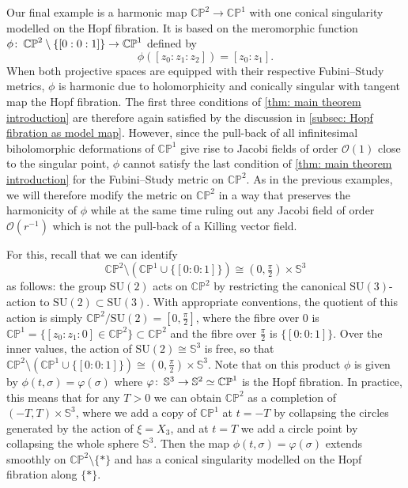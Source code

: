 \documentclass{article}
\numberwithin{equation}{section}        %
\theoremstyle{bfnote}
\theoremstyle{definition}
\theoremstyle{bfremark}
\newcommand{\col}{\colon \thinspace}        %
\newcommand{\Sp}{\mathbb{S}}                %
\begin{document}
Our final example is a harmonic map $\mathbb{CP}^2 \to \mathbb{CP}^1$ with one conical singularity modelled on the Hopf fibration. It is based on the meromorphic function $\phi \col \mathbb{CP}^2 \setminus \{[0:0:1]\} \to \mathbb{CP}^1$ defined by 
\begin{equation*}
    \phi([z_0:z_1:z_2]) = [z_0:z_1] .
\end{equation*}
When both projective spaces are equipped with their respective Fubini--Study metrics, $\phi$ is harmonic due to holomorphicity and conically singular with tangent map the Hopf fibration. The first three conditions of \cref{thm: main theorem introduction} are therefore again satisfied by the discussion in \cref{subsec: Hopf fibration as model map}. However, since the pull-back of all infinitesimal biholomorphic deformations of $\mathbb{CP}^1$ give rise to Jacobi fields of order $\mathcal{O}(1)$ close to the singular point, $\phi$ cannot satisfy the last condition of \cref{thm: main theorem introduction} for the Fubini--Study metric on $\mathbb{CP}^2$. As in the previous examples, we will therefore modify the metric on $\mathbb{CP}^2$ in a way that preserves the harmonicity of $\phi$ while at the same time ruling out any Jacobi field of order $\mathcal{O}(r^{-1})$ which is not the pull-back of a Killing vector field.

For this, recall that we can identify 
\begin{equation*}
    \mathbb{CP}^2 \setminus (\mathbb{CP}^1 \cup \{[0:0:1]\}) \cong (0,\tfrac{\pi}{2}) \times \Sp^3
\end{equation*}
as follows: the group $\mathrm{SU}(2)$ acts on $\mathbb{CP}^2$ by restricting the canonical $\mathrm{SU}(3)$-action to $\mathrm{SU}(2) \subset \mathrm{SU}(3)$. With appropriate conventions, the quotient of this action is simply $\mathbb{CP}^2/\mathrm{SU}(2) = [0,\tfrac{\pi}{2}]$, where the fibre over $0$ is $\mathbb{CP}^1=\{[z_0:z_1:0] \in \mathbb{CP}^2\} \subset \mathbb{CP}^2$ and the fibre over $\frac{\pi}{2}$ is $\{[0:0:1]\}$. Over the inner values, the action of $\mathrm{SU}(2)\cong \Sp^3$ is free, so that $\mathbb{CP}^2 \setminus (\mathbb{CP}^1 \cup \{[0:0:1]\}) \cong (0,\tfrac{\pi}{2}) \times \Sp^3$. Note that on this product $\phi$ is given by $\phi(t,\sigma) = \varphi(\sigma)$ where $\varphi \col \Sp^3 \to \Sp^2 \simeq \mathbb{CP}^1$ is the Hopf fibration. In practice, this means that for any $T > 0$ we can obtain $\mathbb{CP}^2$ as a completion of $(-T,T) \times \Sp^3$, where we add a copy of $\mathbb{CP}^1$ at $t = -T$ by collapsing the circles generated by the action of $\xi = X_3$, and at $t = T$ we add a circle point by collapsing the whole sphere $\Sp^3$. Then the map $\phi(t,\sigma) = \varphi(\sigma)$ extends smoothly on $\mathbb{CP}^2 \setminus \{*\}$ and has a conical singularity modelled on the Hopf fibration along $\{*\}$.
\end{document}
